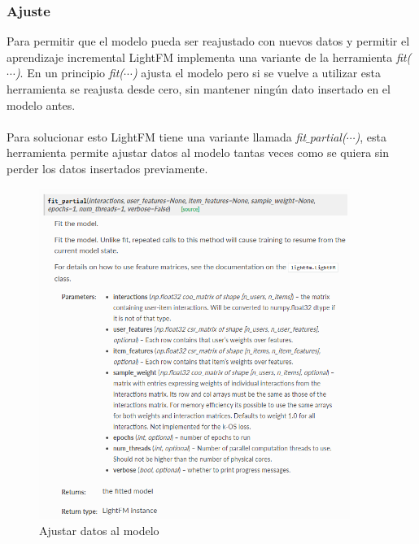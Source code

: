 \subsubsection{Ajuste}
Para permitir que el modelo pueda ser reajustado con nuevos datos y permitir el aprendizaje incremental LightFM implementa una variante de la herramienta \textit{fit($\cdots$)}. En un principio \textit{fit($\cdots$)} ajusta el modelo pero si se vuelve a utilizar esta herramienta se reajusta desde cero, sin mantener ningún dato insertado en el modelo antes.
\\ \\
Para solucionar esto LightFM tiene una variante llamada \textit{fit$\_$partial($\cdots$)}, esta herramienta permite ajustar datos al modelo tantas veces como se quiera sin perder los datos insertados previamente.
\begin{figure}[H]
    \centering
    \includegraphics[width=0.9\textwidth]{Figuras/LightFM_fit_partial.png}    
    \caption{Ajustar datos al modelo} 
    \label{fig:FitPartial}
\end{figure}

